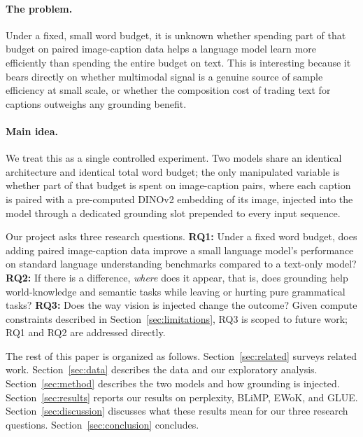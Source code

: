\documentclass[11pt]{article}
\begin{document}
\paragraph{The problem.} Under a fixed, small word budget, it is unknown whether spending part of that budget on paired image-caption data helps a language model learn more efficiently than spending the entire budget on text. This is interesting because it bears directly on whether multimodal signal is a genuine source of sample efficiency at small scale, or whether the composition cost of trading text for captions outweighs any grounding benefit.

\paragraph{Main idea.} We treat this as a single controlled experiment. Two models share an identical architecture and identical total word budget; the only manipulated variable is whether part of that budget is spent on image-caption pairs, where each caption is paired with a pre-computed DINOv2 embedding of its image, injected into the model through a dedicated grounding slot prepended to every input sequence.

Our project asks three research questions. \textbf{RQ1:} Under a fixed word budget, does adding paired image-caption data improve a small language model's performance on standard language understanding benchmarks compared to a text-only model? \textbf{RQ2:} If there is a difference, \emph{where} does it appear, that is, does grounding help world-knowledge and semantic tasks while leaving or hurting pure grammatical tasks? \textbf{RQ3:} Does the way vision is injected change the outcome? Given compute constraints described in Section~\ref{sec:limitations}, RQ3 is scoped to future work; RQ1 and RQ2 are addressed directly.

The rest of this paper is organized as follows. Section~\ref{sec:related} surveys related work. Section~\ref{sec:data} describes the data and our exploratory analysis. Section~\ref{sec:method} describes the two models and how grounding is injected. Section~\ref{sec:results} reports our results on perplexity, BLiMP, EWoK, and GLUE. Section~\ref{sec:discussion} discusses what these results mean for our three research questions. Section~\ref{sec:conclusion} concludes.
\end{document}
